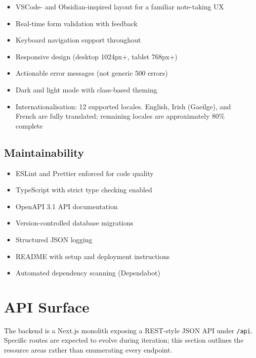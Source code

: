 \documentclass[12pt,a4paper]{article}
\begin{document}
\begin{itemize}
    \item VSCode- and Obsidian-inspired layout for a familiar note-taking UX
    \item Real-time form validation with feedback
    \item Keyboard navigation support throughout
    \item Responsive design (desktop 1024px+, tablet 768px+)
    \item Actionable error messages (not generic 500 errors)
    \item Dark and light mode with class-based theming
    \item Internationalisation: 12 supported locales. English, Irish (Gaeilge), and French are fully translated; remaining locales are approximately 80\% complete
\end{itemize}

\subsection{Maintainability}

\begin{itemize}
    \item ESLint and Prettier enforced for code quality
    \item TypeScript with strict type checking enabled
    \item OpenAPI 3.1 API documentation
    \item Version-controlled database migrations
    \item Structured JSON logging
    \item README with setup and deployment instructions
    \item Automated dependency scanning (Dependabot)
\end{itemize}

\section{API Surface}

The backend is a Next.js monolith exposing a REST-style JSON API under \texttt{/api}. Specific routes are expected to evolve during iteration; this section outlines the resource areas rather than enumerating every endpoint.
\end{document}
